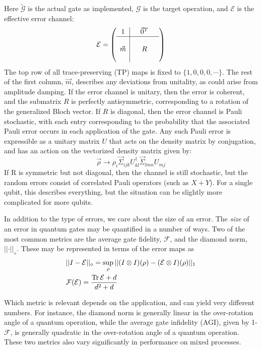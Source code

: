 \documentclass[aps,nofootinbib,pra,notitlepage,twocolumn]{revtex4-1}
\newcommand{\tr}{{\rm Tr\thinspace}}
\newcommand{\actual}{\ensuremath{\tilde{\mathcal{G}}}}
\newcommand{\target}{\ensuremath{{\mathcal{G}}}}
\newcommand{\error}{\ensuremath{{\mathcal{E}}}}
\begin{document}
Here $\actual$ is the actual gate as implemented, $\target$ is the target operation, and $\error$ is the effective error channel:
\begin{equation}\label{eq:process_matrix}
\error =
	\left(\begin{array}{c|cccc}
		1 &  & \vec{0}^T & \\ 
		\hline & &  &  \\
		\vec{m} &  & R &  \\
		 &  &  & 
	\end{array} 	
	\right)
\end{equation}
The top row of all trace-preserving (TP) maps is fixed to $\{1,0,0,0,\cdots\}$.  The rest of the first column, $\vec{m}$, describes any deviations from unitality, as could arise from amplitude damping. If the error channel is unitary, then the error is coherent, and the submatrix $R$ is perfectly antisymmetric, corresponding to a rotation of the generalized Bloch vector. If  $R$ is diagonal, then the error channel is Pauli stochastic, with each entry  corresponding to the probability that the associated Pauli error occurs in each application of the gate. Any such Pauli error is expressible as a unitary matrix $U$ that acts on the density matrix by conjugation, and has an action on the vectorized density matrix given by: 
\begin{equation}
\vec{\rho}\rightarrow \rho_i\vec{\Sigma}_{ijk}U^{\dagger}_{kl}\vec{\Sigma}_{lmn}U_{mj}\end{equation}
 If R is symmetric but not diagonal, then the channel is still stochastic, but the random errors consist of correlated Pauli operators (such as $X+Y$). For a single qubit, this describes everything, but the situation can be slightly more complicated for more qubits. 

In addition to the type of errors, we care about the size of an error. The \emph{size} of an error in quantum gates may  be quantified in a number of ways. Two of the most common metrics are the average gate fidelity, $\mathcal{F}$, and the diamond norm, $\vert\vert\cdot\vert\vert_\diamond$. These may be represented in terms of the error maps as
\begin{align}
	&\vert\vert I - \error \vert\vert_\diamond = \sup_\rho \vert \vert (I\otimes I)(\rho) - (\error \otimes I)(\rho) \vert\vert_1\\
	&\mathcal{F}(\error) = \frac{\tr{\error} + d}{d^2 + d} 
\end{align}

Which metric is relevant depends on the application, and can yield very different numbers. For instance, the diamond norm is generally linear in the over-rotation angle of a quantum operation, while the average gate infidelity (AGI), given by 1-$\mathcal{F}$, is generally quadratic in the over-rotation angle of a quantum operation. These two metrics also vary significantly in performance on mixed processes.
\end{document}
